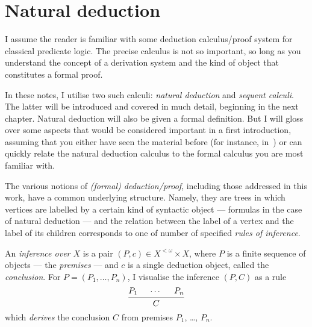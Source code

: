\chapter{Natural deduction}

I assume the reader is familiar with some deduction calculus/proof system for classical predicate logic.
The precise calculus is not so important, so long as you understand the concept of a derivation system and the kind of object that constitutes a formal proof.

In these notes, I utilise two such calculi: \emph{natural deduction} and \emph{sequent calculi}.
The latter will be introduced and covered in much detail, beginning in the next chapter.
Natural deduction will also be given a formal definition.
But I will gloss over some aspects that would be considered important in a first introduction, assuming that you either have seen the material before (for instance, in~) or can quickly relate the natural deduction calculus to the formal calculus you are most familiar with.

The various notions of \emph{(formal) deduction/proof}, including those addressed in this work, have a common underlying structure.
Namely, they are trees in which vertices are labelled by a certain kind of syntactic object --- formulas in the case of natural deduction --- and the relation between the label of a vertex and the label of its children corresponds to one of number of specified \emph{rules of inference}.

An \emph{inference over \( X \)} is a pair \( ( P , c ) ∈ X^{<ω} × X \), where \( P \) is a finite sequence of objects --- the \emph{premises} --- and \( c \) is a single deduction object, called the \emph{conclusion}.
For \( P = ( P_1 , …, P_n ) \), I visualise the inference \( ( P , C ) \) as a rule
\[
\begin{prooftree}
	\hypo{ P_1 }
	\hypod \hypo{ P_n }
	\infer3{C}
\end{prooftree}
\]
which \emph{derives} the conclusion \( C \) from premises \( P_1 \), …, \( P_n \).

